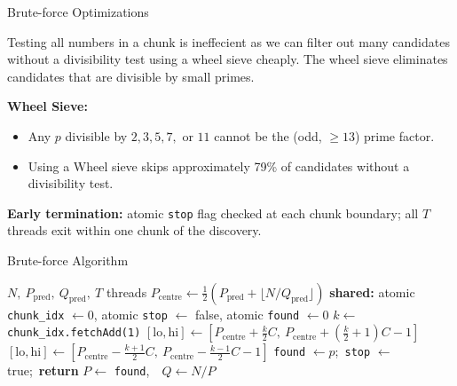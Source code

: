 \documentclass[9pt]{beamer}
\begin{document}
\begin{frame}{Brute-force Optimizations}

Testing all numbers in a chunk is ineffecient as we can filter out many candidates without a divisibility test using a wheel sieve cheaply. The wheel sieve eliminates candidates that are divisible by small primes.

\medskip
\textbf{Wheel Sieve:}
\begin{itemize}
  \item Any $p$ divisible by $2, 3, 5, 7,$ or $11$ cannot be the (odd, $\ge 13$) prime factor.
  \item Using a Wheel sieve skips approximately 79\% of candidates without a divisibility test.
\end{itemize}

\medskip
\textbf{Early termination:} atomic \texttt{stop} flag checked at each chunk boundary; all $T$ threads exit within one chunk of the discovery.

\end{frame}

\begin{frame}{Brute-force Algorithm}

\begin{algorithm}[H]
\caption{Parallel spiral divisor search}
\begin{algorithmic}[1]
\Require $N,\ P_{\text{pred}},\ Q_{\text{pred}},\ T$ threads
\State $P_{\text{centre}} \gets \tfrac{1}{2}(P_{\text{pred}} + \lfloor N/Q_{\text{pred}} \rfloor)$
\State \textbf{shared:} atomic \texttt{chunk\_idx} $\gets 0$, atomic \texttt{stop} $\gets$ false, atomic \texttt{found} $\gets 0$
\medskip
{}
    \State $k \gets$ \texttt{chunk\_idx.fetchAdd(1)} 
     
      \State $[\text{lo},\text{hi}] \gets [P_{\text{centre}} + \tfrac{k}{2}C,\ P_{\text{centre}} + (\tfrac{k}{2}{+}1)C - 1]$
    \Else {}
      \State $[\text{lo},\text{hi}] \gets [P_{\text{centre}} - \tfrac{k{+}1}{2}C,\ P_{\text{centre}} - \tfrac{k{-}1}{2}C - 1]$
    \EndIf
        \State \texttt{found} $\gets p$;\ \texttt{stop} $\gets$ true;\ \textbf{return}
      \EndIf
    \EndFor
  \EndWhile
\EndFor
\State \Return $P \gets$ \texttt{found},\ \ $Q \gets N / P$
\end{algorithmic}
\end{algorithm}
\end{frame}
\end{document}
